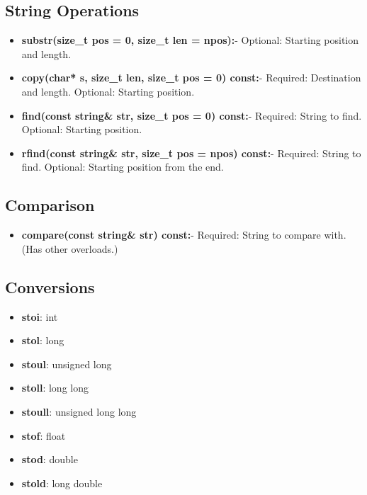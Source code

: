 \documentclass{report}
\begin{document}
    \pagebreak \bigbreak \noindent 
    \subsection{String Operations}
    \begin{itemize}
        \item \textbf{substr(size\_t \textbf{pos = 0, size\_t len = npos):}}- Optional: Starting position and length.
        \item \textbf{copy(char* s, size\_t len, size\_t pos = 0) const:}- Required: Destination and length. Optional: Starting position.
        \item \textbf{find(const string\& str, size\_t pos = 0) const:}- Required: String to find. Optional: Starting position.
        \item \textbf{rfind(const string\& str, size\_t pos = npos) const:}- Required: String to find. Optional: Starting position from the end.
    \end{itemize}
    \bigbreak \noindent 
    \subsection{Comparison}
    \begin{itemize}
        \item \textbf{compare(const string\& str) const:}- Required: String to compare with. (Has other overloads.)
    \end{itemize}

    \bigbreak \noindent 
    \subsection{Conversions}
    \begin{itemize}
        \item \textbf{stoi}: int
        \item \textbf{stol}: long
        \item \textbf{stoul}: unsigned long
        \item \textbf{stoll}: long long
        \item \textbf{stoull}: unsigned long long
        \item \textbf{stof}: float
        \item \textbf{stod}: double
        \item \textbf{stold}: long double
    \end{itemize}

    \pagebreak \bigbreak \noindent 
\end{document}
